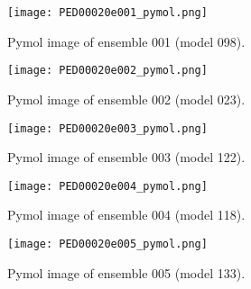 \begin{figure}[H]
    \centering
		\texttt{[image: PED00020e001\_pymol.png]}
		\caption{Pymol image of ensemble 001 (model 098).}
		\label{model001p}
\end{figure}

\begin{figure}[H]
    \centering
		\texttt{[image: PED00020e002\_pymol.png]}
		\caption{Pymol image of ensemble 002 (model 023).}
		\label{model002p}
\end{figure}

\begin{figure}[H]
    \centering
		\texttt{[image: PED00020e003\_pymol.png]}
		\caption{Pymol image of ensemble 003 (model 122).}
		\label{model003p}
\end{figure}

\begin{figure}[H]
    \centering
		\texttt{[image: PED00020e004\_pymol.png]}
		\caption{Pymol image of ensemble 004 (model 118).}
		\label{model004p}
\end{figure}

\begin{figure}[H]
    \centering
		\texttt{[image: PED00020e005\_pymol.png]}
		\caption{Pymol image of ensemble 005 (model 133).}
		\label{model005p}
\end{figure}
